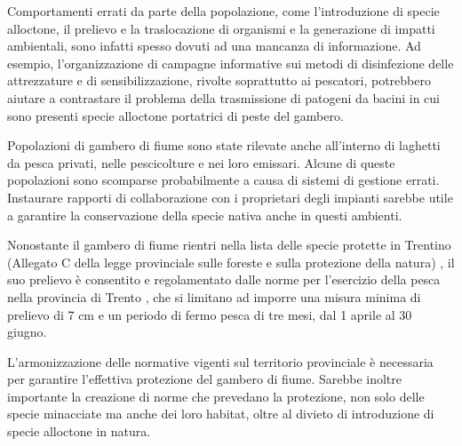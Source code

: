 \documentclass[10pt,twoside,openany,x11names,svgnames,italian,a5paper,dvipsnames,table]{memoir}
\newcommand\chapterillustration{}
\begin{document}
Comportamenti errati da parte della popolazione, come l’introduzione di specie alloctone, il prelievo e la traslocazione di organismi e la generazione di impatti ambientali, sono infatti spesso dovuti ad una mancanza di informazione. Ad esempio, l’organizzazione di campagne informative sui metodi di disinfezione delle attrezzature e di sensibilizzazione, rivolte soprattutto ai pescatori, potrebbero aiutare a contrastare il problema della trasmissione di patogeni da bacini in cui sono presenti specie alloctone portatrici di peste del gambero.

Popolazioni di gambero di fiume sono state rilevate anche all’interno di laghetti da pesca privati, nelle pescicolture e nei loro emissari. Alcune di queste popolazioni sono scomparse probabilmente a causa di sistemi di gestione errati. Instaurare rapporti di collaborazione con i proprietari degli impianti sarebbe utile a garantire la conservazione della specie nativa anche in questi ambienti.

Nonostante il gambero di fiume rientri nella lista delle specie protette in Trentino (Allegato C della legge provinciale sulle foreste e sulla protezione della natura) \cite{consiglioPAT09}, il suo prelievo è consentito e regolamentato dalle norme per l’esercizio della pesca nella provincia di Trento \cite{consiglioPAT79}, che si limitano ad imporre una misura minima di prelievo di 7 cm e un periodo di fermo pesca di tre mesi, dal 1 aprile al 30 giugno.

L’armonizzazione delle normative vigenti sul territorio provinciale è necessaria per garantire l’effettiva protezione del gambero di fiume. Sarebbe inoltre importante la creazione di norme che prevedano la protezione, non solo delle specie minacciate ma anche dei loro habitat, oltre al divieto di introduzione di specie alloctone in natura.



\setlength\afterchapskip{10mm}
\end{document}
